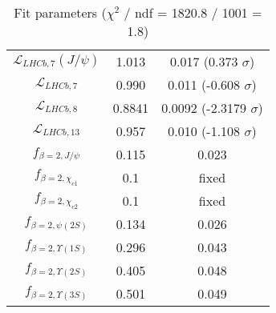 \begin{table}[h!]
\begin{tabular}{c|c|c}
$\mathcal L_{LHCb,7}(J/\psi)$ & 1.013 & 0.017 (0.373 $\sigma$) \\
$\mathcal L_{LHCb,7}$ & 0.990 & 0.011 (-0.608 $\sigma$) \\
$\mathcal L_{LHCb,8}$ & 0.8841 & 0.0092 (-2.3179 $\sigma$) \\
$\mathcal L_{LHCb,13}$ & 0.957 & 0.010 (-1.108 $\sigma$) \\
$f_{\beta=2,J/\psi}$ & 0.115 & 0.023 \\
$f_{\beta=2,\chi_{c1}}$ & 0.1 & fixed \\
$f_{\beta=2,\chi_{c2}}$ & 0.1 & fixed \\
$f_{\beta=2,\psi(2S)}$ & 0.134 & 0.026 \\
$f_{\beta=2,\Upsilon(1S)}$ & 0.296 & 0.043 \\
$f_{\beta=2,\Upsilon(2S)}$ & 0.405 & 0.048 \\
$f_{\beta=2,\Upsilon(3S)}$ & 0.501 & 0.049 \\
\end{tabular}
\caption{Fit parameters ($\chi^2$ / ndf = 1820.8 / 1001 = 1.8)}
\end{table}
